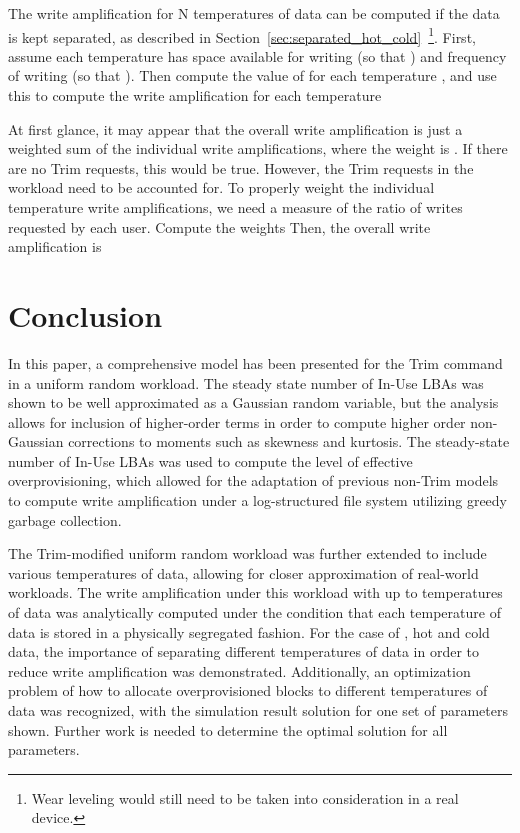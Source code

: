 \documentclass[prodmode,acmtos]{acmsmall}
\begin{document}
The write amplification for N temperatures of data can be computed if the data is kept separated, as described in Section~\ref{sec:separated_hot_cold}~\footnote{Wear leveling would still need to be taken into consideration in a real device.}.  First, assume each temperature  has  space available for writing (so that ) and frequency of writing  (so that ).  Then compute the value of  for each temperature , and use this to compute the write amplification for each temperature

At first glance, it may appear that the overall write amplification is just a weighted sum of the individual write amplifications, where the weight is .  If there are no Trim requests, this would be true.  However, the Trim requests in the workload need to be accounted for.  To properly weight the individual temperature write amplifications, we need a measure of the ratio of writes requested by each user.  Compute the weights 
Then, the overall write amplification is









\section{Conclusion}
In this paper, a comprehensive model has been presented for the Trim command in a uniform random workload.  The steady state number of In-Use LBAs was shown to be well approximated as a Gaussian random variable, but the analysis allows for inclusion of higher-order terms in order to compute higher order non-Gaussian corrections to moments such as skewness and kurtosis.  The steady-state number of In-Use LBAs was used to compute the level of effective overprovisioning, which allowed for the adaptation of previous non-Trim models to compute write amplification under a log-structured file system utilizing greedy garbage collection.

The Trim-modified uniform random workload was further extended to include various temperatures of data, allowing for closer approximation of real-world workloads.  The write amplification under this workload with up to  temperatures of data was analytically computed under the condition that each temperature of data is stored in a physically segregated fashion.  For the case of , hot and cold data, the importance of separating different temperatures of data in order to reduce write amplification was demonstrated.  Additionally, an optimization problem of how to allocate overprovisioned blocks to different temperatures of data was recognized, with the simulation result solution for one set of parameters shown.  Further work is needed to determine the optimal solution for all parameters.
\end{document}
